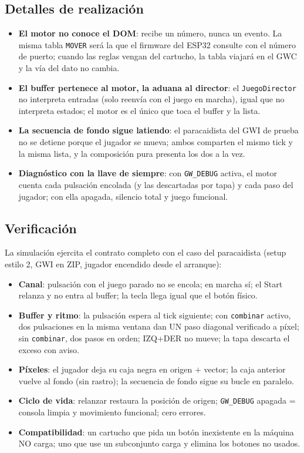 \subsection{Detalles de realización}
\label{subsec:DetallesF3I2}

\begin{itemize}
	\item \textbf{El motor no conoce el DOM}: recibe un número, nunca un evento. La
	misma tabla \texttt{MOVER} será la que el firmware del ESP32 consulte con el número de
	puerto; cuando las reglas vengan del cartucho, la tabla viajará en el GWC y la vía del
	dato no cambia.
	\item \textbf{El buffer pertenece al motor, la aduana al director}: el
	\texttt{JuegoDirector} no interpreta entradas (solo reenvía con el juego en marcha),
	igual que no interpreta estados; el motor es el único que toca el buffer y la lista.
	\item \textbf{La secuencia de fondo sigue latiendo}: el paracaidista del GWI de
	prueba no se detiene porque el jugador se mueva; ambos comparten el mismo tick y la
	misma lista, y la composición pura presenta los dos a la vez.
	\item \textbf{Diagnóstico con la llave de siempre}: con \texttt{GW\_DEBUG} activa,
	el motor cuenta cada pulsación encolada (y las descartadas por tapa) y cada paso del
	jugador; con ella apagada, silencio total y juego funcional.
\end{itemize}

\subsection{Verificación}
\label{subsec:VerificacionF3I2}

La simulación ejercita el contrato completo con el caso del paracaidista (setup estilo 2,
GWI en ZIP, jugador encendido desde el arranque):

\begin{itemize}
	\item \textbf{Canal}: pulsación con el juego parado no se encola; en marcha sí; el
	Start relanza y no entra al buffer; la tecla llega igual que el botón
	físico.
	\item \textbf{Buffer y ritmo}: la pulsación espera al tick siguiente; con
	\texttt{combinar} activo, dos pulsaciones en la misma ventana dan UN paso diagonal
	verificado a píxel; sin \texttt{combinar}, dos pasos en orden; IZQ+DER no mueve; la
	tapa descarta el exceso con aviso.
	\item \textbf{Píxeles}: el jugador deja su caja negra en origen $+$ vector; la caja
	anterior vuelve al fondo (sin rastro); la secuencia de fondo sigue su bucle en
	paralelo.
	\item \textbf{Ciclo de vida}: relanzar restaura la posición de origen;
	\texttt{GW\_DEBUG} apagada = consola limpia y movimiento funcional; cero errores.
	\item \textbf{Compatibilidad}: un cartucho que pida un botón inexistente en la
	máquina NO carga; uno que use un subconjunto carga y elimina los botones no usados.
\end{itemize}

